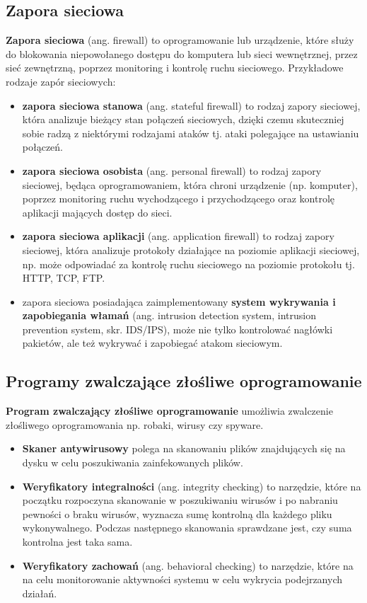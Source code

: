 \documentclass{article}
\begin{document}
\subsection{Zapora sieciowa}
\textbf{Zapora sieciowa} (ang. firewall) to oprogramowanie lub urządzenie, które służy do blokowania niepowołanego dostępu do komputera lub sieci wewnętrznej, przez sieć zewnętrzną, poprzez monitoring i kontrolę ruchu sieciowego. Przykładowe rodzaje zapór sieciowych:
\begin{itemize}
    \item \textbf{zapora sieciowa stanowa} (ang. stateful firewall) to rodzaj zapory sieciowej, która analizuje bieżący stan połączeń sieciowych, dzięki czemu skuteczniej sobie radzą z niektórymi rodzajami ataków tj. ataki polegające na ustawianiu połączeń. 
    \item \textbf{zapora sieciowa osobista} (ang. personal firewall) to rodzaj zapory sieciowej, będąca oprogramowaniem, która chroni urządzenie (np. komputer), poprzez monitoring ruchu wychodzącego i przychodzącego oraz kontrolę aplikacji mających dostęp do sieci.
    \item \textbf{zapora sieciowa aplikacji} (ang. application firewall) to rodzaj zapory sieciowej, która analizuje protokoły działające na poziomie aplikacji sieciowej, np. może odpowiadać za kontrolę ruchu sieciowego na poziomie protokołu tj. HTTP, TCP, FTP. 
    \item zapora sieciowa posiadająca zaimplementowany \textbf{system wykrywania i zapobiegania włamań} (ang. intrusion detection system, intrusion prevention system, skr. IDS/IPS), może nie tylko kontrolować nagłówki pakietów, ale też wykrywać i zapobiegać atakom sieciowym.
\end{itemize}
\subsection{Programy zwalczające złośliwe oprogramowanie}
\textbf{Program zwalczający złośliwe oprogramowanie} umożliwia zwalczenie złośliwego oprogramowania np. robaki, wirusy czy spyware.
\begin{itemize}
    \item \textbf{Skaner antywirusowy} polega na skanowaniu plików znajdujących się na dysku w celu poszukiwania zainfekowanych plików.
    \item \textbf{Weryfikatory integralności} (ang. integrity checking) to narzędzie, które na początku rozpoczyna skanowanie w poszukiwaniu wirusów i po nabraniu pewności o braku wirusów, wyznacza sumę kontrolną dla każdego pliku wykonywalnego. Podczas następnego skanowania sprawdzane jest, czy suma kontrolna jest taka sama.
    \item \textbf{Weryfikatory zachowań} (ang. behavioral checking) to narzędzie, które na na celu monitorowanie aktywności systemu w celu wykrycia podejrzanych działań.
\end{itemize}
\end{document}
